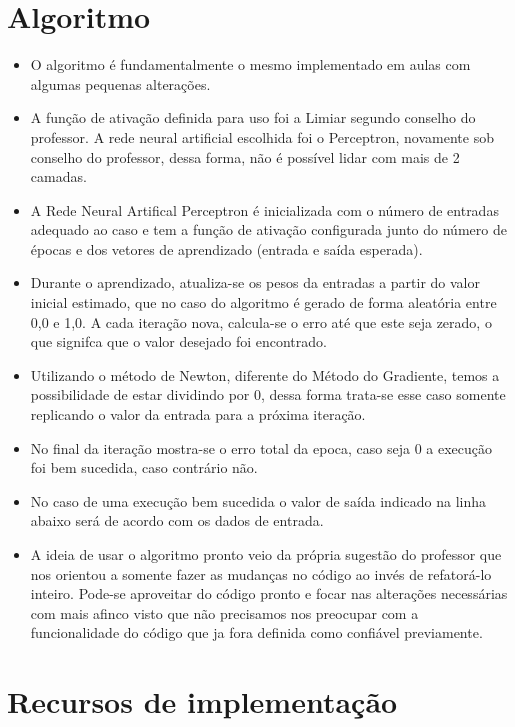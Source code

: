 \documentclass[12pt]{article}
\begin{document}
\section{Algoritmo}

\begin{itemize}
    \item O algoritmo é fundamentalmente o mesmo implementado em aulas com algumas pequenas alterações. 
    \item A função de ativação definida para uso foi a Limiar segundo conselho do professor. A rede neural artificial escolhida foi o Perceptron, novamente sob conselho do professor, dessa forma, não é possível lidar com mais de 2 camadas.
    \item A Rede Neural Artifical Perceptron é inicializada com o número de entradas adequado ao caso e tem a função de ativação configurada junto do número de épocas e dos vetores de aprendizado (entrada e saída esperada).
    \item Durante o aprendizado, atualiza-se os pesos da entradas a partir do valor inicial estimado, que no caso do algoritmo é gerado de forma aleatória entre 0,0 e 1,0. A cada iteração nova, calcula-se o erro até que este seja zerado, o que signifca que o valor desejado foi encontrado.
    \item Utilizando o método de Newton, diferente do Método do Gradiente, temos a possibilidade de estar dividindo por 0, dessa forma trata-se esse caso somente replicando o valor da entrada para a próxima iteração.
    \item No final da iteração mostra-se o erro total da epoca, caso seja 0 a execução foi bem sucedida, caso contrário não.
    \item No caso de uma execução bem sucedida o valor de saída indicado na linha abaixo será de acordo com os dados de entrada.
    \item A ideia de usar o algoritmo pronto veio da própria sugestão do professor que nos orientou a somente fazer as mudanças no código ao invés de refatorá-lo inteiro. Pode-se aproveitar do código pronto e focar nas alterações necessárias com mais afinco visto que não precisamos nos preocupar com a funcionalidade do código que ja fora definida como confiável previamente.
\end{itemize}

\section{Recursos de implementação}
\end{document}
